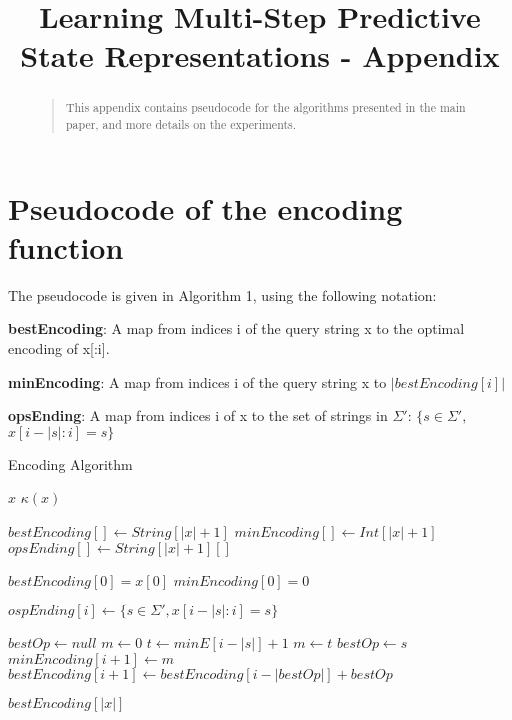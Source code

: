 \documentclass[letterpaper]{article}
\begin{document}
\title{Learning Multi-Step Predictive State Representations - Appendix}
\maketitle

\begin{abstract}
\begin{quote}
This appendix contains pseudocode for the algorithms presented in the main paper, and more details on the experiments.

\end{quote}
\end{abstract}

\section{Pseudocode of the encoding function}

The pseudocode is given in Algorithm 1, using the following notation:

\textbf{bestEncoding}: A map from indices i of the query string x to the optimal encoding of x[:i].

\textbf{minEncoding}: A map from indices i of the query string x to $|bestEncoding[i]|$

\textbf{opsEnding}: A map from indices i of x to the set of strings in $\Sigma'$: $\{s \in \Sigma',$ $x[i-|s|:i] = s\}$

\algnewcommand{}
\algnewcommand{}

\algnewcommand\INPUT{\item[\algorithmicinput]}
\algnewcommand\OUTPUT{\item[\algorithmicoutput]}

\begin{algorithm}
\caption{Encoding Algorithm}
\label{Encoding Algorithm}
\begin{algorithmic}[1]
\INPUT $x$
\OUTPUT $\kappa(x)$


\State $bestEncoding[] \gets String[|x|+1]$
\State $minEncoding[] \gets Int[|x|+1]$
\State $opsEnding[] \gets String[|x|+1][]$

\State $bestEncoding[0] = x[0]$
\State $minEncoding[0] = 0$

	 \State $ospEnding[i] \gets \{s \in \Sigma', x[i-|s|:i] = s\}$
\EndFor

	\State $bestOp \gets null$
	\State $m \gets 0$ 
		\State $t \gets minE[i-|s|] + 1$
			\State $m \gets t$ 
			\State $bestOp \gets s$
		\EndIf
	\EndFor
	\State $minEncoding[i+1] \gets m$
	\State $bestEncoding[i+1] \gets bestEncoding[i-|bestOp|] + bestOp$
\EndFor

\State \Return $bestEncoding[|x|]$

\EndProcedure
\end{algorithmic}
\end{algorithm}
\end{document}
